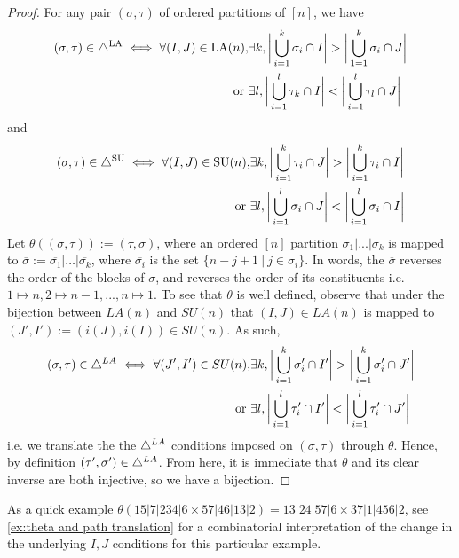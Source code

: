 \begin{proof}
For any pair $(\sigma,\tau)$ of ordered partitions of $[n]$, we have
\begin{align*}
    (\sigma,\tau)\in \triangle^{\mathrm{LA}}
    \iff  \forall (I,J) \in \mathrm{LA}(n), &\exists k, \bigg| \bigcup_{i=1}^k \sigma_i \cap I \bigg| > \bigg|\bigcup_{1=1}^k \sigma_i \cap J \bigg|
    \\
    \text{ or } 
    &\exists l, \bigg| \bigcup_{i=1}^l \tau_k \cap I \bigg| < \bigg|\bigcup_{i=1}^l \tau_l \cap J \bigg|
\end{align*}
and 
\begin{align*}
    (\sigma,\tau)\in \triangle^{\mathrm{SU}}
    \iff  \forall (I,J) \in \mathrm{SU}(n),
    &\exists k, \bigg| \bigcup_{i=1}^{k} \tau_{i} \cap J \bigg| > \bigg|\bigcup_{i=1}^{k}\tau_{i} \cap I \bigg|
    \\
    \text{ or } 
    &\exists l, \bigg| \bigcup_{i=1}^{l} \sigma_{i} \cap J \bigg| < \bigg|\bigcup_{i=1}^{l} \sigma_{i} \cap I \bigg|    
\end{align*}
Let $\theta ((\sigma,\tau)) := (\overline{\tau},\overline{\sigma})$, where an ordered $[n]$ partition $\sigma_1|...|\sigma_k$ is mapped to $\overline{\sigma}:=\overline{\sigma_{1}} | \ldots | \overline{\sigma_{k}}$, where $\overline{\sigma_i}$ is the set $\{n-j+1 \ | \ j \in \sigma_i\}$. In words, the $\overline{\sigma}$ reverses the order of the blocks of $\sigma$, and reverses the order of its constituents i.e. $1\mapsto n,2 \mapsto n-1,...,n\mapsto 1$. To see that $\theta$ is well defined, observe that under the bijection between $LA(n)$ and $SU(n)$ that $(I,J) \in LA(n)$ is mapped to $(J',I'):=(i(J),i(I)) \in SU(n)$. As such,
\begin{align*}
    (\sigma,\tau)\in \triangle^{LA}
    \iff  \forall (J',I') \in SU(n), 
    &\exists k, \bigg| \bigcup_{i=1}^{k} \sigma'_{i} \cap I' \bigg| > \bigg|\bigcup_{i=1}^{k} \sigma'_{i} \cap J' \bigg|
    \\
    \text{ or } 
    &\exists l, \bigg| \bigcup_{i=1}^{l} \tau'_{i} \cap I' \bigg| < \bigg|\bigcup_{i=1}^{l} \tau'_{i} \cap J' \bigg|
\end{align*}
i.e. we translate the the $\triangle^{LA}$ conditions imposed on $(\sigma,\tau)$ through $\theta$. Hence, by definition $(\tau',\sigma')\in \triangle^{LA}$. From here, it is immediate that $\theta$ and its clear inverse are both injective, so we have a bijection.
\end{proof}
As a quick example $\theta(15|7|234|6\times 57|46|13|2)=13|24|57|6\times 37|1|456|2$, see \cref{ex:theta and path translation} for a combinatorial interpretation of the change in the underlying $I,J$ conditions for this particular example.
